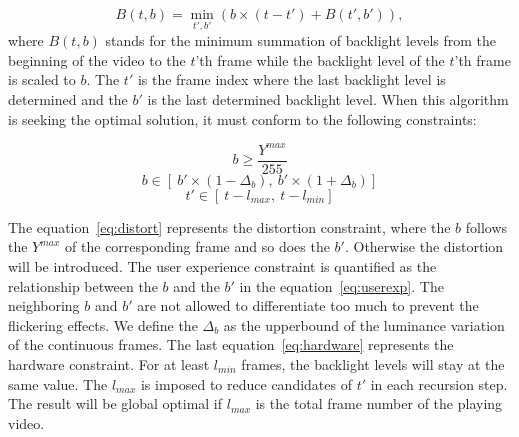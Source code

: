 \begin{equation}
  \label{eq:dp}
B(t,b) = \min_{t',b'}(b \times (t - t') + B(t', b')),
\end{equation}
where $B(t, b)$ stands for the minimum summation of backlight levels
from the beginning of the video to the $t$'th frame while the
backlight level of the $t$'th frame is scaled to $b$. The $t'$ is the
frame index where the last backlight level is determined and the $b'$
is the last determined backlight level. When this algorithm is seeking
the optimal solution, it must conform to the following constraints:


\begin{equation}
  \label{eq:distort}
  b \ge \frac{Y^{max}}{255}
\end{equation}
\begin{equation}
  \label{eq:userexp}
  b \in [\ b' \times ( 1 - \Delta_b ),\ b' \times ( 1 +
    \Delta_b)]
\end{equation}
\begin{equation}
  \label{eq:hardware}
  t' \in [\ t - l_{max},\ t - l_{min}] 
\end{equation}


The equation~\ref{eq:distort} represents the distortion constraint,
where the $b$ follows the $Y^{max}$ of the corresponding frame and
so does the $b'$. Otherwise the distortion will be introduced. The
user experience constraint is quantified as the relationship between
the $b$ and the $b'$ in the equation~\ref{eq:userexp}. The neighboring
$b$ and $b'$ are not allowed to differentiate too much to prevent the
flickering effects. We define the $\Delta_b$ as the upperbound of the
luminance variation of the continuous frames. The last equation~\ref{eq:hardware}
represents the hardware constraint. For at least $l_{min}$ frames, the
backlight levels will stay at the same value. The $l_{max}$ is imposed
to reduce candidates of $t'$ in each recursion step. The result will
be  global optimal if $l_{max}$ is the total frame number of the
playing video. 


